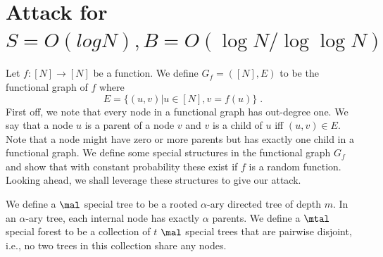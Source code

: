 \section{Attack for $S=O(log N),B=O(\log N/\log \log N)$}
Let $f:[N]\to [N]$ be a function. We define $G_f=([N],E)$ to be the functional graph of $f$ where 
\[E=\{(u,v)|u\in [N],v=f(u)\}\;.\] 
First off, we note that every node in a functional graph has out-degree one. We say that a node $u$ is a parent of a node $v$ and $v$ is a child of $u$ iff $(u,v)\in E$. Note that a node might have zero or more parents but has exactly one child in a functional graph.
We define some special structures in the functional graph $G_f$ and show that with constant probability these exist if $f$ is a random function. Looking ahead, we shall leverage these structures to give our attack.

We define a $\mal$ special tree to be a rooted $\alpha$-ary directed tree of depth $m$. In an $\alpha$-ary tree, each internal node has exactly $\alpha$ parents.
We define a $\mtal$ special forest to be a collection of $t$ $\mal$ special trees that are pairwise disjoint, i.e., no two trees in this collection share any nodes.



